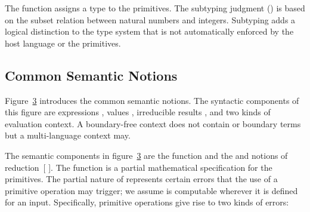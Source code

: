 \documentclass[screen=true, 10pt, acmsmall]{acmart}
\let\SOriginalthesubsubsection\thesubsubsection
\newcommand{\Ssubsection}[2]{\subsection[#1]{#2}\let\thesubsubsection\SOriginalthesubsubsection}
\newcommand{\AutobibLink}[1]{\color{ACMPurple}{#1}}
\newcommand{\FigureRef}[2]{#1}
\newcommand{\Autobibref}[1]{#1}
\providecommand{\AutobibLink}[1]{#1}
\newcommand{\subteq}{\mathrel{\leqslant\kern-0.3em\raisebox{0.3ex}{:}}}
\newcommand{\ebase}{{E^{\bullet}}}
\newcommand{\esd}{E}
\newcommand{\vdyn}{\mathsf{dyn}}
\newcommand{\vsta}{\mathsf{stat}}
\newcommand{\rrfont}[1]{\mathsf{#1}}
\newcommand{\rrsymb}{\vartriangleright}
\newcommand{\rrD}{\mathrel{\rrsymb_{\rrfont{D}}}}
\newcommand{\rrS}{\mathrel{\rrsymb_{\rrfont{S}}}}
\newcommand{\vresult}{r}
\begin{document}
The \relax{$\Delta$} function assigns a type to the primitives.
The subtyping judgment (\relax{$\subteq$}) is based on the subset relation between
 natural numbers and integers.
Subtyping adds a logical distinction to the type system that is not automatically
 enforced by the host language or the primitives.

\Ssubsection{Common Semantic Notions}{Common Semantic Notions}\label{t:x28part_x22secx3acommonx2dsemanticsx22x29}

Figure~\hyperref[t:x28counter_x28x22figurex22_x22figx3amultix2dreductionx22x29x29]{\FigureRef{3}{t:x28counter_x28x22figurex22_x22figx3amultix2dreductionx22x29x29}} introduces the common semantic notions.
The syntactic components of this figure are expressions ,
 values , irreducible results \relax{$\vresult$},
 and two kinds of evaluation context.
A boundary{-}free context \relax{$\ebase$} does not contain \relax{$\vdyn$} or \relax{$\vsta$} boundary terms but a multi{-}language
 context \relax{$\esd$} may.

The semantic components in figure~\hyperref[t:x28counter_x28x22figurex22_x22figx3amultix2dreductionx22x29x29]{\FigureRef{3}{t:x28counter_x28x22figurex22_x22figx3amultix2dreductionx22x29x29}} are the
 \relax{$\delta$} function and the \relax{$\rrS$} and \relax{$\rrD$} notions of reduction\Autobibref{~[\hyperref[t:x28autobib_x22Henk_BarendregtThe_Lambda_Calculusx3a_Its_Syntax_and_SemanticsNorthx2dHolland_Publishing_Company1981x22x29]{\AutobibLink{Barendregt}} \hyperref[t:x28autobib_x22Henk_BarendregtThe_Lambda_Calculusx3a_Its_Syntax_and_SemanticsNorthx2dHolland_Publishing_Company1981x22x29]{\AutobibLink{1981}}]}.
 The \relax{$\delta$} function
 is a partial mathematical specification for the primitives.
The partial nature of \relax{$\delta$} represents certain
 errors that the use of a primitive operation may trigger;
 we assume \relax{$\delta$} is computable wherever it is defined for an input.
Specifically, primitive operations give rise to two kinds of errors:
\end{document}
